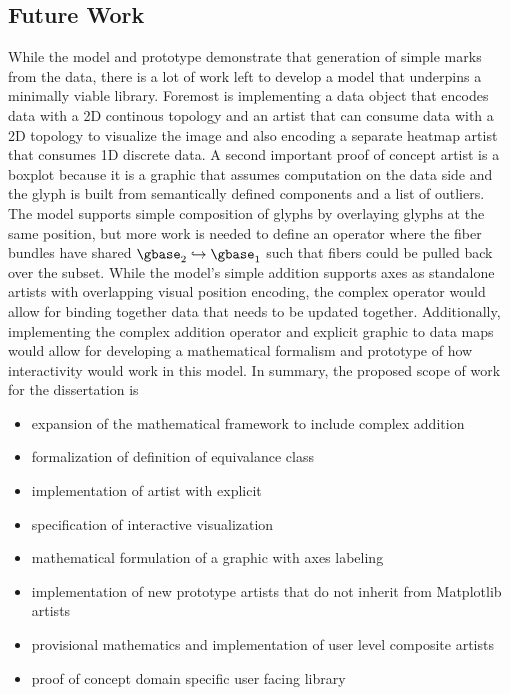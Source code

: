 \documentclass[../main.tex]{subfiles}
\begin{document}
\subsection{Future Work}
While the model and prototype demonstrate that generation of simple marks from the data, there is a lot of work left to develop a model that underpins a minimally viable library. Foremost is implementing a data object that encodes data with a 2D continous topology and an artist that can consume data with a 2D topology to visualize the image\cite{ToryRethinkingVisualization2004, haber1990visualization,hansen2011visualization} and also encoding a separate heatmap\cite{wilkinsonHistoryClusterHeat2009,loua1873atlas} artist that consumes 1D discrete data.  A second important proof of concept artist is a boxplot\cite{wickham40YearsBoxplots2011} because it is a graphic that assumes computation on the data side and the glyph is built from semantically defined components and a list of outliers. The model supports simple composition of glyphs by overlaying glyphs at the same position, but more work is needed to define an operator where the fiber bundles have shared $\gbase_2 \hookrightarrow \gbase_1$ such that fibers could be pulled back over the subset. While the model's simple addition supports axes as standalone artists with overlapping visual position encoding, the complex operator would allow for binding together data that needs to be updated together. Additionally, implementing the complex addition operator and explicit graphic to data maps would allow for developing a mathematical formalism and prototype of how interactivity would work in this model.
In summary, the proposed scope of work for the dissertation is
\begin{itemize}
    \item expansion of the mathematical framework to include complex addition
    \item formalization of definition of equivalance class \vartisteq
    \item implementation of artist with explicit \vindex\
    \item specification of interactive visualization
    \item mathematical formulation of a graphic with axes labeling
    \item implementation of new prototype artists that do not inherit from Matplotlib artists
    \item provisional mathematics and implementation of user level composite artists
    \item proof of concept domain specific user facing library 
\end{itemize}
\end{document}
